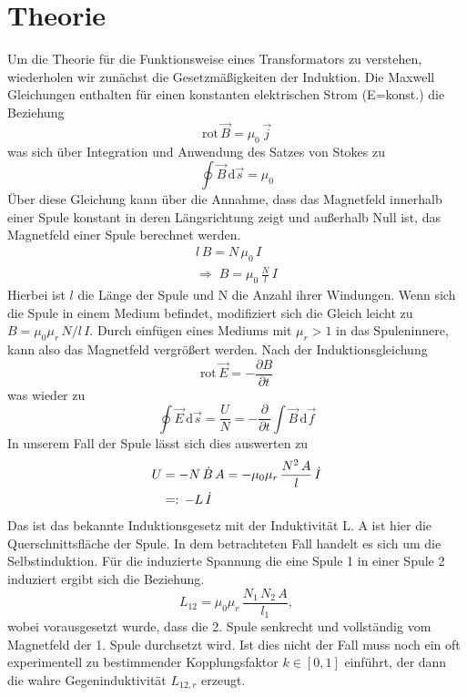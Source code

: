 \documentclass[a4paper, 12pt,]{scrartcl}
\begin{document}
\section{Theorie}
Um die Theorie für die Funktionsweise eines Transformators zu verstehen, wiederholen wir zunächst die Gesetzmäßigkeiten der Induktion. Die Maxwell Gleichungen enthalten für einen konstanten elektrischen Strom (E=konst.) die Beziehung
\begin{equation*}\text{rot}\,\vec{B}=\mu_0\,\vec{j}\end{equation*}
was sich über Integration und Anwendung des Satzes von Stokes zu
\begin{equation}\oint\vec{B}\,\text{d}\vec{s}=\mu_0\label{e1}\end{equation}
Über diese Gleichung kann über die Annahme, dass das Magnetfeld innerhalb einer Spule konstant in deren Längsrichtung zeigt und außerhalb Null ist, das Magnetfeld einer Spule berechnet werden.
\begin{align*}l\,B=N\,\mu_0\,I\\
\Rightarrow\;B=\mu_0\,\frac{N}{l}\,I\end{align*}
Hierbei ist $l$ die Länge der Spule und N die Anzahl ihrer Windungen. Wenn sich die Spule in einem Medium befindet, modifiziert sich die Gleich leicht zu $B=\mu_0\mu_r\,N/l\,I$. Durch einfügen eines Mediums mit $\mu_r>1$ in das Spuleninnere, kann also das Magnetfeld vergrößert werden.
Nach der Induktionsgleichung
$$\text{rot}\,\vec{E}=-\frac{\partial{B}}{\partial{t}}$$
was wieder zu
\begin{equation}\oint\vec{E}\,\text{d}\vec{s}=\frac{U}{N}=-\frac{\partial}{\partial{t}}\int\vec{B}\,\text{d}\vec{f}\label{e2}\end{equation}
In unserem Fall der Spule lässt sich dies auswerten zu
\begin{align}U&=-N\,\dot{B}\,A=-\mu_0\mu_r\,\frac{N^2\,A}{l}\,\dot{I}\notag\\
&=:\,{-L}\,\dot{I}\label{e3}\end{align}
Das ist das bekannte Induktionsgesetz mit der Induktivität L. A ist hier die Querschnittsfläche der Spule. In dem betrachteten Fall handelt es sich um die Selbstinduktion. Für die induzierte Spannung die eine Spule 1 in einer Spule 2 induziert ergibt sich die Beziehung.
$$L_{12}=\mu_0\mu_r\,\frac{N_1\,N_2\,A}{l_1},$$
wobei vorausgesetzt wurde, dass die 2. Spule senkrecht und vollständig vom Magnetfeld der 1. Spule durchsetzt wird. Ist dies nicht der Fall muss noch ein oft experimentell zu bestimmender Kopplungsfaktor $k\in[0,1]$ einführt, der dann die wahre Gegeninduktivität $L_{12,r}$ erzeugt.
\end{document}
